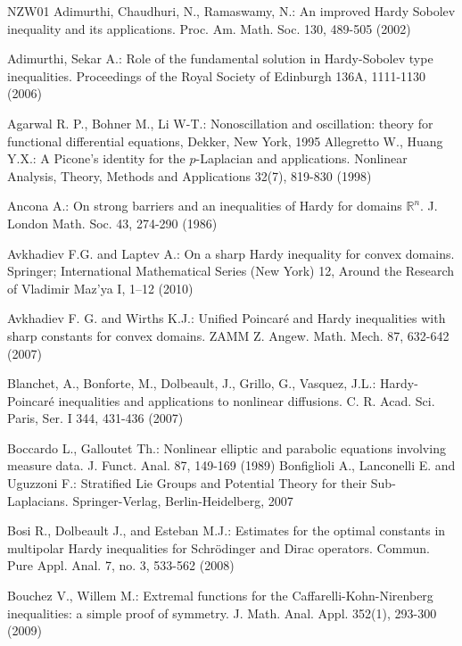 \documentclass[a4paper,12pt,reqno]{amsart}
\theoremstyle{theorem}
\numberwithin{equation}{section}
\theoremstyle{plain}
\theoremstyle{definition}
\theoremstyle{defi}
\begin{document}
\begin{thebibliography}{NZW01}
Adimurthi, Chaudhuri, N., Ramaswamy, N.: An improved Hardy Sobolev inequality and its applications. Proc. Am. Math. Soc. 130, 489-505 (2002)

Adimurthi, Sekar A.: Role of the fundamental solution in Hardy-Sobolev type inequalities. Proceedings of the Royal Society of Edinburgh 136A, 1111-1130 (2006)

Agarwal R. P., Bohner M., Li W-T.: Nonoscillation and oscillation: theory for functional differential equations, Dekker, New York, 1995
Allegretto W., Huang Y.X.: A Picone's identity for the $p$-Laplacian and applications. Nonlinear Analysis, Theory, Methods and Applications 32(7), 819-830 (1998)	

	Ancona A.:
	\newblock On strong barriers and an inequalities of Hardy for domains $\mathbb{R}^n$. J. London Math. Soc. 43, 274-290 (1986) 

Avkhadiev F.G. and Laptev A.:
\newblock On a sharp Hardy inequality for convex domains.
\newblock Springer; International Mathematical Series (New York) 12, Around the Research of Vladimir Maz'ya I, 1–12 (2010) 

Avkhadiev F. G. and Wirths K.J.:
\newblock Unified Poincar\'e and Hardy inequalities with sharp constants for convex domains.
\newblock ZAMM Z. Angew. Math. Mech. 87, 632-642 (2007)
	

Blanchet, A., Bonforte, M., Dolbeault, J., Grillo, G., Vasquez, J.L.: Hardy-Poincar\'e inequalities and applications to nonlinear diffusions. C. R. Acad. Sci. Paris, Ser. I 344, 431-436 (2007)

Boccardo L., Galloutet Th.: Nonlinear elliptic and parabolic equations involving measure data. J. Funct. Anal. 87, 149-169 (1989) 
Bonfiglioli A., Lanconelli E. and Uguzzoni F.: Stratified Lie Groups and Potential Theory for their Sub-Laplacians. Springer-Verlag, Berlin-Heidelberg, 2007

Bosi R., Dolbeault J., and Esteban M.J.: Estimates for the optimal constants in multipolar Hardy inequalities for Schr\"odinger and Dirac operators. Commun. Pure Appl. Anal. 7, no. 3, 533-562 (2008)

Bouchez V., Willem M.: Extremal functions for the Caffarelli-Kohn-Nirenberg inequalities: a simple proof of symmetry. J. Math. Anal. Appl. 352(1), 293-300 (2009)


\end{thebibliography}
\end{document}
